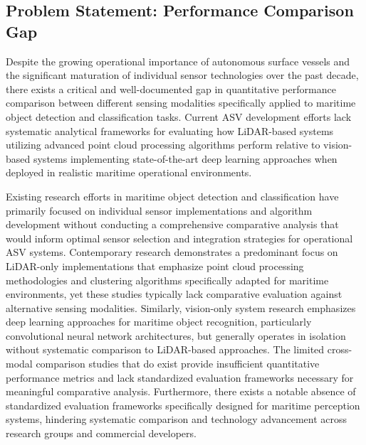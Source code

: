 \documentclass{erauthesis}
\begin{document}
\subsection{Problem Statement: Performance Comparison Gap}

Despite the growing operational importance of autonomous surface vessels and the significant maturation of individual sensor technologies over the past decade, there exists a critical and well-documented gap in quantitative performance comparison between different sensing modalities specifically applied to maritime object detection and classification tasks. Current \ac{ASV} development efforts lack systematic analytical frameworks for evaluating how \ac{LiDAR}-based systems utilizing advanced point cloud processing algorithms perform relative to vision-based systems implementing state-of-the-art deep learning approaches when deployed in realistic maritime operational environments.

Existing research efforts in maritime object detection and classification have primarily focused on individual sensor implementations and algorithm development without conducting a comprehensive comparative analysis that would inform optimal sensor selection and integration strategies for operational \ac{ASV} systems. Contemporary research demonstrates a predominant focus on \ac{LiDAR}-only implementations that emphasize point cloud processing methodologies and clustering algorithms specifically adapted for maritime environments, yet these studies typically lack comparative evaluation against alternative sensing modalities. Similarly, vision-only system research emphasizes deep learning approaches for maritime object recognition, particularly convolutional neural network architectures, but generally operates in isolation without systematic comparison to \ac{LiDAR}-based approaches. The limited cross-modal comparison studies that do exist provide insufficient quantitative performance metrics and lack standardized evaluation frameworks necessary for meaningful comparative analysis. Furthermore, there exists a notable absence of standardized evaluation frameworks specifically designed for maritime perception systems, hindering systematic comparison and technology advancement across research groups and commercial developers.
\end{document}
